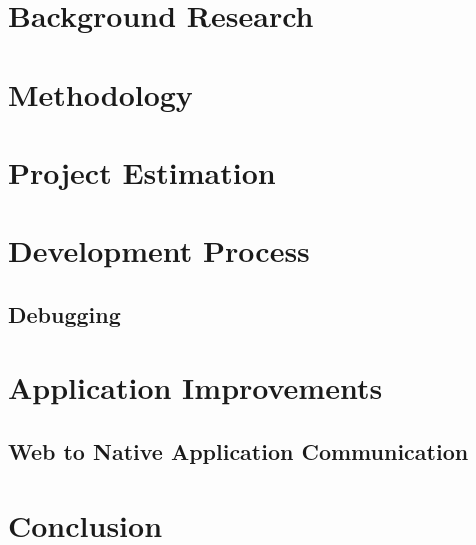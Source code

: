 \documentclass[]{report}
\begin{document}
	\section{Background Research}
	\section{Methodology}
	\section{Project Estimation}
	\section{Development Process}
		\subsection{Debugging}
	\section{Application Improvements}
		\subsection{Web to Native Application Communication}
	\section{Conclusion}
\end{document}
